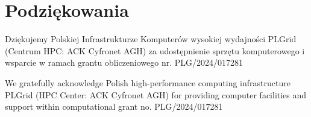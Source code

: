 \documentclass[data-science]{agh-wi} %
\begin{document}
\chapter{Podziękowania}

Dziękujemy Polskiej Infrastrukturze Komputerów wysokiej wydajności PLGrid (Centrum HPC: ACK Cyfronet AGH) za udostępnienie sprzętu komputerowego i wsparcie w ramach grantu obliczeniowego nr. PLG/2024/017281
\vspace*{1.5cm}

We gratefully acknowledge Polish high-performance computing infrastructure PLGrid (HPC Center: ACK Cyfronet AGH) for providing computer facilities and support within computational grant no. PLG/2024/017281


\printbibliography
\end{document}
